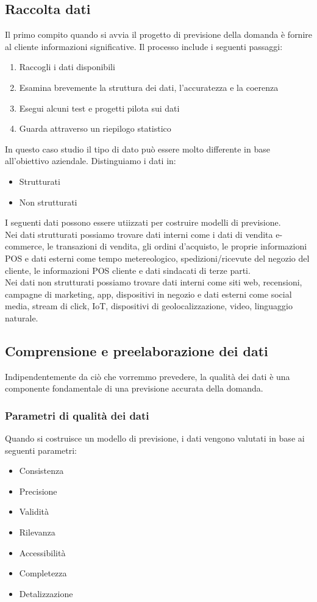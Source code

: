 \documentclass[12pt,a4paper]{report}
\begin{document}
\subsection{Raccolta dati}
Il primo compito quando si avvia il progetto di previsione della domanda è fornire al cliente informazioni significative. Il processo include i seguenti passaggi:
\begin{enumerate}
\item Raccogli i dati disponibili
\item Esamina brevemente la struttura dei dati, l'accuratezza e la coerenza
\item Esegui alcuni test e progetti pilota sui dati
\item Guarda attraverso un riepilogo statistico
\end{enumerate}
In questo caso studio il tipo di dato può essere molto differente in base all'obiettivo aziendale. Distinguiamo i dati in:
\begin{itemize}
\item Strutturati
\item Non strutturati
\end{itemize}
I seguenti dati possono essere utiizzati per costruire modelli di previsione.\\
Nei dati strutturati possiamo trovare dati interni come i dati di vendita e-commerce, le transazioni di vendita, gli ordini d'acquisto, le proprie informazioni POS e dati esterni come tempo metereologico, spedizioni/ricevute del negozio del cliente, le informazioni POS cliente e dati sindacati di terze parti.\\
Nei dati non strutturati possiamo trovare dati interni come siti web, recensioni, campagne di marketing, app, dispositivi in negozio e dati esterni come social media, stream di click, IoT, dispositivi di geolocalizzazione, video, linguaggio naturale.\\

\subsection{Comprensione e preelaborazione dei dati}
Indipendentemente da ciò che vorremmo prevedere, la qualità dei dati è una componente fondamentale di una previsione accurata della domanda.

\subsubsection{Parametri di qualità dei dati}
Quando si costruisce un modello di previsione, i dati vengono valutati in base ai seguenti parametri:
\begin{itemize}
\item Consistenza
\item Precisione
\item Validità
\item Rilevanza
\item Accessibilità
\item Completezza
\item Detalizzazione
\end{itemize}
\end{document}
